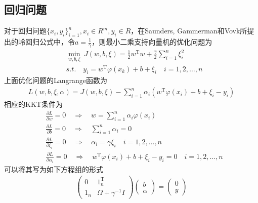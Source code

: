     \subsection{回归问题}
        \par
        对于回归问题$\{x_i,y_i\}_{i=1}^n,x_i\in R^m,y_i\in R$，在Saunders, Gammerman和Vovk所提出的岭回归公式中，令$a = \frac{1}{\gamma}$，则最小二乘支持向量机的优化问题为
        \begin{align*}
        & \min_{w,b,\xi} \ J(w,b,\xi) = \frac{1}{2}w^\mathrm{T}w+\frac{\gamma}{2}\sum_{i=1}^n\xi_i^2\\
        & s.t. \quad y_i = w^\mathrm{T}\varphi(x_k)+b+\xi_i \quad i=1,2,\dots,n
        \end{align*}
        上面优化问题的Langrange函数为
        \begin{align*}
        L(w,b,\xi,\alpha) = J(w,b,\xi) - \sum_{i=1}^n \alpha_i (w^\mathrm{T}\varphi(x_i)+b+\xi_i-y_i)
        \end{align*}
        相应的KKT条件为
        \begin{align*}
        & \frac{\partial L}{\partial w} = 0 \quad \Rightarrow\quad w = \sum_{i=1}^n\alpha_i\varphi(x_i)\\
        & \frac{\partial L}{\partial b}=0 \quad \Rightarrow \quad\sum_{i=1}^n \alpha_i = 0\\
        & \frac{\partial L}{\partial \xi_i} = 0\quad \Rightarrow \quad\alpha_i = \gamma \xi_i\quad i=1,2,\dots,n\\
        & \frac{\partial L}{\partial \alpha_i} = 0\quad \Rightarrow \quad w^\mathrm{T}\varphi(x_i)+b+\xi_i - y_i = 0\quad i=1,2,\dots,n
        \end{align*}
        可以将其写为如下方程组的形式
        \begin{align*}
        \begin{pmatrix}
        0 & 1_n^\mathrm{T}\\
        1_n & \Omega+\gamma^{-1}I
        \end{pmatrix}
        \begin{pmatrix}
        b\\
        \alpha
        \end{pmatrix}
        =\begin{pmatrix}
        0\\
        y
        \end{pmatrix}
        \end{align*}

